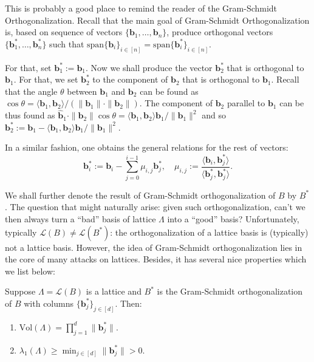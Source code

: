 \documentclass{template}
\begin{document}
This is probably a good place to remind the reader of the Gram-Schmidt
Orthogonalization. Recall that the main goal of Gram-Schmidt Orthogonalization
is, based on sequence of vectors $\{\mathbf{b}_1,\dots,\mathbf{b}_n\}$, produce
orthogonal vectors $\{\mathbf{b}_1^*,\dots,\mathbf{b}_n^*\}$ such that
$\text{span}\{\mathbf{b}_i\}_{i \in [n]} = \text{span}\{\mathbf{b}_i^*\}_{i \in
[n]}$.

For that, set $\mathbf{b}_1^* := \mathbf{b}_1$. Now we shall produce the vector
$\mathbf{b}_2^*$ that is orthogonal to $\mathbf{b}_1$. For that, we set
$\mathbf{b}_2^*$ to the component of $\mathbf{b}_2$ that is orthogonal to
$\mathbf{b}_1$. Recall that the angle $\theta$ between $\mathbf{b}_1$ and
$\mathbf{b}_2$ can be found as $\cos\theta = \langle \mathbf{b}_1, \mathbf{b}_2
\rangle /(\|\mathbf{b}_1\| \cdot \|\mathbf{b}_2\|)$. The component of
$\mathbf{b}_2$ parallel to $\mathbf{b}_1$ can be thus found as
$\widehat{\mathbf{b}}_1 \cdot \|\mathbf{b}_2\|\cos\theta = \langle \mathbf{b}_1,
\mathbf{b}_2 \rangle\mathbf{b}_1 /\|\mathbf{b}_1\|^2$ and so $\mathbf{b}_2^* :=
\mathbf{b}_1 - \langle \mathbf{b}_1, \mathbf{b}_2 \rangle\mathbf{b}_1
/\|\mathbf{b}_1\|^2$.

In a similar fashion, one obtains the general relations for the rest of vectors:
\begin{equation*}
    \mathbf{b}_i^* := \mathbf{b}_i - \sum_{j=0}^{i-1}\mu_{i,j}\mathbf{b}_j^*, \quad \mu_{i,j} := \frac{\langle \mathbf{b}_i, \mathbf{b}_j^*\rangle}{\langle \mathbf{b}_j^*, \mathbf{b}_j^*\rangle}.
\end{equation*}

We shall further denote the result of Gram-Schmidt orthogonalization of $B$ by
$B^*$. The question that might naturally arise: given such orthogonalization,
can't we then always turn a ``bad'' basis of lattice $\Lambda$ into a ``good''
basis? Unfortunately, typically $\mathcal{L}(B) \neq \mathcal{L}(B^*)$: the
orthogonalization of a lattice basis is (typically) not a lattice basis.
However, the idea of Gram-Schmidt orthogonalization lies in the core of many
attacks on lattices. Besides, it has several nice properties which we list
below:
\begin{proposition}\label{prop:gram-schmidt-props}
    Suppose $\Lambda = \mathcal{L}(B)$ is a lattice and $B^*$ is the
    Gram-Schmidt orthogonalization of $B$ with columns $\{\mathbf{b}^*_j\}_{j
    \in [d]}$. Then:
    \begin{enumerate}
        \item[\textit{(a)}] $\text{Vol}(\Lambda) = \prod_{j=1}^d \|\mathbf{b}_j^*\|$.
        \item[\textit{(b)}] $\lambda_1(\Lambda) \geq \min_{j \in [d]}\|\mathbf{b}_j^*\| >
        0$. 
    \end{enumerate}
\end{proposition}
\end{document}

